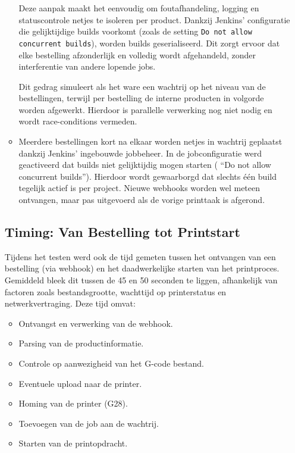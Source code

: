 \begin{enumerate}
\begin{itemize}
    Deze aanpak maakt het eenvoudig om foutafhandeling, logging en statuscontrole netjes te isoleren per product. Dankzij Jenkins' configuratie die gelijktijdige builds voorkomt (zoals de setting \texttt{Do not allow concurrent builds}), worden builds geserialiseerd. Dit zorgt ervoor dat elke bestelling afzonderlijk en volledig wordt afgehandeld, zonder interferentie van andere lopende jobs.
    
    Dit gedrag simuleert als het ware een wachtrij op het niveau van de bestellingen, terwijl per bestelling de interne producten in volgorde worden afgewerkt. Hierdoor is parallelle verwerking nog niet nodig en wordt race-conditions vermeden.
    
    
    \item Meerdere bestellingen kort na elkaar worden netjes in wachtrij geplaatst dankzij Jenkins' ingebouwde jobbeheer. In de jobconfiguratie werd geactiveerd dat builds niet gelijktijdig mogen starten ( “Do not allow concurrent builds”). Hierdoor wordt gewaarborgd dat slechts één build tegelijk actief is per project. Nieuwe webhooks worden wel meteen ontvangen, maar pas uitgevoerd als de vorige printtaak is afgerond.
\end{itemize}

\subsection{Timing: Van Bestelling tot Printstart}

Tijdens het testen werd ook de tijd gemeten tussen het ontvangen van een bestelling (via webhook) en het daadwerkelijke starten van het printproces. Gemiddeld bleek dit tussen de 45 en 50 seconden te liggen, afhankelijk van factoren zoals bestandsgrootte, wachttijd op printerstatus en netwerkvertraging. Deze tijd omvat:

\begin{itemize}
    \item Ontvangst en verwerking van de webhook.
    \item Parsing van de productinformatie.
    \item Controle op aanwezigheid van het G-code bestand.
    \item Eventuele upload naar de printer.
    \item Homing van de printer (G28).
    \item Toevoegen van de job aan de wachtrij.
    \item Starten van de printopdracht.
\end{itemize}


\end{enumerate}
